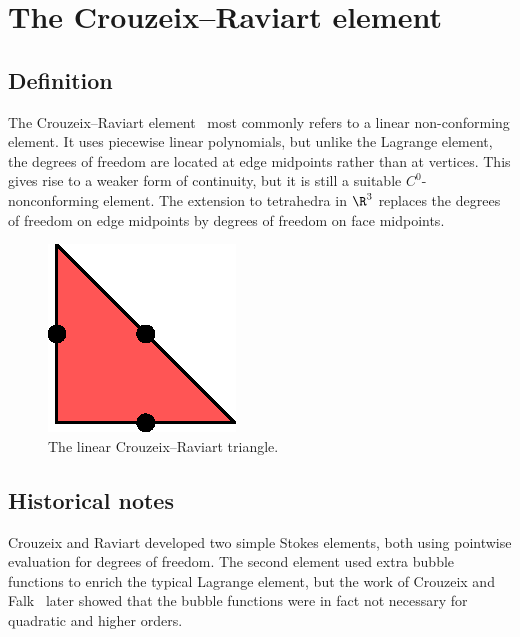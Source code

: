 
\newpage

\section{The Crouzeix--Raviart element}

\subsection{Definition}

The Crouzeix--Raviart element~\cite{CrouzeixRaviart1973} most commonly
refers to a linear non-confor\-ming element. It uses piecewise linear
polynomials, but unlike the Lagrange element, the degrees of freedom
are located at edge midpoints rather than at vertices.  This gives
rise to a weaker form of continuity, but it is still a suitable
$C^0$-nonconforming element. The extension to tetrahedra in $\R^3$
replaces the degrees of freedom on edge midpoints by degrees of
freedom on face midpoints.


\begin{figure}[H]
  \begin{center} \includegraphics[width=\elementwidth]{chapters/kirby-6/eps/CR1.eps}
    \caption{The linear Crouzeix--Raviart triangle.}  \end{center}
\end{figure}

\subsection{Historical notes}

Crouzeix and Raviart developed two simple Stokes elements, both using
pointwise evaluation for degrees of freedom. The second element used
extra bubble functions to enrich the typical Lagrange element, but the
work of Crouzeix and Falk~\cite{CrouzeixFalk1989} later showed that
the bubble functions were in fact not necessary for quadratic and
higher orders.

